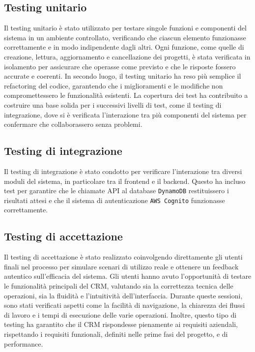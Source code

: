 \documentclass[target=bach,aauheader=,style=]{thud}
\begin{document}
\subsection{Testing unitario}
Il testing unitario è stato utilizzato per testare singole funzioni e componenti del sistema in un ambiente controllato, verificando che ciascun elemento funzionasse correttamente e in modo indipendente dagli altri. Ogni funzione, come quelle di creazione, lettura, aggiornamento e cancellazione dei progetti, è stata verificata in isolamento per assicurare che operasse come previsto e che le risposte fossero accurate e coerenti. In secondo luogo, il testing unitario ha reso più semplice il refactoring del codice, garantendo che i miglioramenti e le modifiche non compromettessero le funzionalità esistenti. La copertura dei test ha contribuito a costruire una base solida per i successivi livelli di test, come il testing di integrazione, dove si è verificata l'interazione tra più componenti del sistema per confermare che collaborassero senza problemi.

\subsection{Testing di integrazione}
Il testing di integrazione è stato condotto per verificare l'interazione tra diversi moduli del sistema, in particolare tra il frontend e il backend. Questo ha incluso test per garantire che le chiamate API al database \texttt{DynamoDB} restituissero i risultati attesi e che il sistema di autenticazione \texttt{AWS Cognito} funzionasse correttamente.

\subsection{Testing di accettazione}
Il testing di accettazione è stato realizzato coinvolgendo direttamente gli utenti finali nel processo per simulare scenari di utilizzo reale e ottenere un feedback autentico sull'efficacia del sistema. Gli utenti hanno avuto l'opportunità di testare le funzionalità principali del CRM, valutando sia la correttezza tecnica delle operazioni, sia la fluidità e l'intuitività dell'interfaccia. Durante queste sessioni, sono stati verificati aspetti come la facilità di navigazione, la chiarezza dei flussi di lavoro e i tempi di esecuzione delle varie operazioni. Inoltre, questo tipo di testing ha garantito che il CRM rispondesse pienamente ai requisiti aziendali, rispettando i requisiti funzionali, definiti nelle prime fasi del progetto, e di performance.
\end{document}
